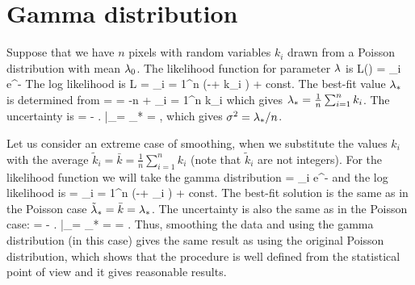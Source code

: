 \newpage
\section{Gamma distribution}

Suppose that we have $n$ pixels with random variables $k_i$ drawn from a Poisson distribution with mean $\lambda_0$.
The likelihood function for parameter $\lambda$ is
\be
L(\ld) = \prod_i  e^{-\ld}
\ee
The log likelihood is
\be
\log L = \sum_{i = 1}^n (-\ld + k_i \log \ld) + const.
\ee
The best-fit value $\lambda_*$ is determined from
 =  = -n +  \sum_{i = 1}^n k_i
\ee
which gives $\lambda_* = \frac{1}{n} \sum_{i = 1}^n k_i$.
The uncertainty is
\be
{} = - \left.  \right|_{\ld = \ld_*} = ,
\ee
which gives $\sigma^2 = \lambda_* / n$.

Let us consider an extreme case of smoothing, when we substitute the values $k_i$ with the average $\tilde{k}_i = \bar{k} = \frac{1}{n} \sum_{i = 1}^n k_i$
(note that $\tilde{k}_i$ are not integers).
For the likelihood function we will take the gamma distribution
\be
{} = \prod_i  e^{-\ld}
\ee
and the log likelihood is
\be
\log {} = \sum_{i = 1}^n (-\ld + _i \log \ld) + const.
\ee
The best-fit solution is the same as in the Poisson case $\tilde{\lambda}_* = \bar{k} = {\lambda}_*$.
The uncertainty is also the same as in the Poisson case:
\be
{} = - \left.  \right|_{\ld = \td{\ld}_*} =  = .
\ee
Thus, smoothing the data and using the gamma distribution (in this case) gives the same result as using the original Poisson distribution,
which shows that the procedure is well defined from the statistical point of view and it gives reasonable results.